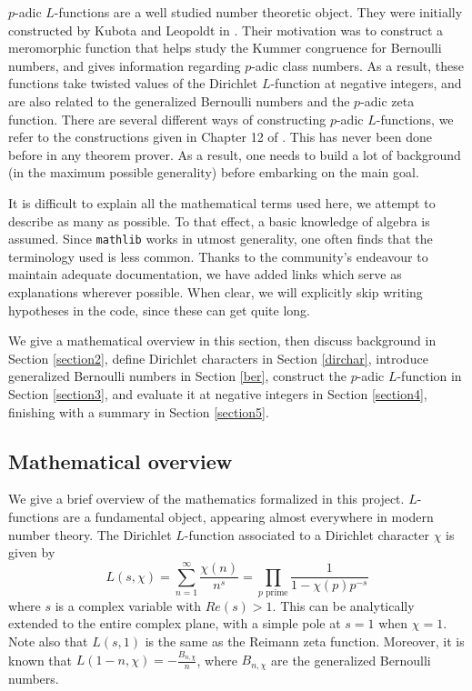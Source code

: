 \documentclass[a4paper,UKenglish,cleveref, autoref, thm-restate]{lipics-v2021}
\newcommand{\lean}[1]{\texttt{#1}\xspace} %
\begin{document}
$p$-adic $L$-functions are a well studied number theoretic object. They were initially constructed 
by Kubota and Leopoldt in \cite{KL}. Their motivation was to construct a meromorphic function that helps study 
the Kummer congruence for Bernoulli numbers, and gives information regarding $p$-adic class numbers. 
As a result, these functions take twisted values of the Dirichlet $L$-function at negative integers, and 
are also related to the generalized Bernoulli numbers and the $p$-adic zeta function. There are several different ways of 
constructing $p$-adic $L$-functions, we refer to the constructions
given in Chapter 12 of \cite{cyc}. This has never been done before in any 
theorem prover. As a result, one needs to build a lot of background (in the maximum possible generality) 
before embarking on the main goal.

It is difficult to explain all the mathematical terms used here, we attempt to describe as many as possible. To that effect, 
a basic knowledge of algebra is assumed. Since \lean{mathlib} works in utmost generality, one often finds that the terminology 
used is less common. Thanks to the community's endeavour to maintain adequate documentation, we have added links which serve as 
explanations wherever possible. When clear, we will explicitly skip writing hypotheses in the code, since these can get quite long.

We give a mathematical overview in this section, then discuss background in Section \ref{section2}, define Dirichlet characters in Section \ref{dirchar}, 
introduce generalized Bernoulli numbers in Section \ref{ber}, construct the $p$-adic $L$-function in Section \ref{section3}, and evaluate it at negative integers in Section \ref{section4}, finishing with a summary in Section \ref{section5}. 
\subsection{Mathematical overview}
We give a brief overview of the mathematics formalized in this project. 
$L$-functions are a fundamental object, appearing almost everywhere in modern 
number theory. The Dirichlet $L$-function associated to a Dirichlet character $\chi$ is given by  
$$ L(s, \chi) = \sum_{n = 1}^{\infty} \frac{\chi (n)}{n^s} = \prod_{p \text{ prime}} \frac{1}{1 - \chi (p) p^{-s}}$$
where $s$ is a complex variable with $Re(s) > 1$. This can be analytically extended 
to the entire complex plane, with a simple pole at $s = 1$ when $\chi = 1$. Note also 
that $L(s, 1)$ is the same as the Reimann zeta function. Moreover, it is known that 
$L(1 - n, \chi) = - \frac{B_{n, \chi}}{n}$, where $B_{n, \chi}$ are the generalized 
Bernoulli numbers. 
\end{document}

